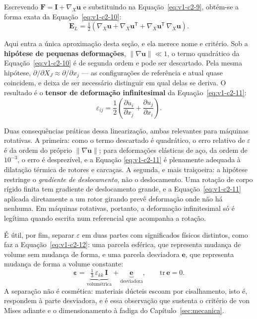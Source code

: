 \documentclass[12pt,a4paper]{article}
\numberwithin{equation}{section}
\numberwithin{table}{section}
\numberwithin{figure}{section}
\begin{document}
Escrevendo $\mathbf{F} = \mathbf{I} + \nabla_{\!X}\mathbf{u}$ e substituindo na
Equação~\eqref{eq:v1-c2-9}, obtém-se a forma exata da
Equação~\eqref{eq:v1-c2-10}:
\begin{equation}\label{eq:v1-c2-10}
\mathbf{E}_L = \tfrac{1}{2}\left( \nabla_{\!X}\mathbf{u} +
\nabla_{\!X}\mathbf{u}^{\mathsf{T}} +
\nabla_{\!X}\mathbf{u}^{\mathsf{T}}\,\nabla_{\!X}\mathbf{u} \right).
\end{equation}

Aqui entra a única aproximação desta seção, e ela merece nome e critério.
Sob a \textbf{hipótese de pequenas deformações}, $\|\nabla\mathbf{u}\| \ll 1$,
o termo quadrático da Equação~\eqref{eq:v1-c2-10} é de segunda ordem e pode ser
descartado. Pela mesma hipótese, $\partial/\partial X_J \approx \partial/\partial
x_j$ --- as configurações de referência e atual quase coincidem, e deixa de ser
necessário distinguir em qual delas se deriva. O resultado é o \textbf{tensor
de deformação infinitesimal} da Equação~\eqref{eq:v1-c2-11}:
\begin{equation}\label{eq:v1-c2-11}
\varepsilon_{ij} = \frac{1}{2}\left( \frac{\partial u_i}{\partial x_j} +
\frac{\partial u_j}{\partial x_i} \right).
\end{equation}

Duas consequências práticas dessa linearização, ambas relevantes para máquinas
rotativas. A primeira: como o termo descartado é quadrático, o erro relativo de
$\varepsilon$ é da ordem do próprio $\|\nabla\mathbf{u}\|$; para deformações
elásticas de aço, da ordem de $10^{-3}$, o erro é desprezível, e a Equação
\eqref{eq:v1-c2-11} é plenamente adequada à dilatação térmica de rotores e
carcaças. A segunda, e mais traiçoeira: a hipótese restringe o \emph{gradiente
de deslocamento}, não o deslocamento. Uma rotação de corpo rígido finita tem
gradiente de deslocamento grande, e a Equação~\eqref{eq:v1-c2-11} aplicada
diretamente a um rotor girando prevê deformação onde não há nenhuma. Em
máquinas rotativas, portanto, a deformação infinitesimal só é legítima quando
escrita num referencial que acompanha a rotação.

É útil, por fim, separar $\varepsilon$ em duas partes com significados físicos
distintos, como faz a Equação~\eqref{eq:v1-c2-12}: uma parcela esférica, que
representa mudança de volume sem mudança de forma, e uma parcela desviadora
$\mathbf{e}$, que representa mudança de forma a volume constante:
\begin{equation}\label{eq:v1-c2-12}
\boldsymbol{\varepsilon} = \underbrace{\tfrac{1}{3}\,\varepsilon_{kk}\,\mathbf{I}}_{\text{volumétrica}}
+ \underbrace{\mathbf{e}}_{\text{desviadora}},
\qquad \mathrm{tr}\,\mathbf{e} = 0 .
\end{equation}
A separação não é cosmética: materiais dúcteis escoam por cisalhamento, isto é,
respondem à parte desviadora, e é essa observação que sustenta o critério de
von Mises adiante e o dimensionamento à fadiga do Capítulo~\ref{sec:mecanica}.
\end{document}
